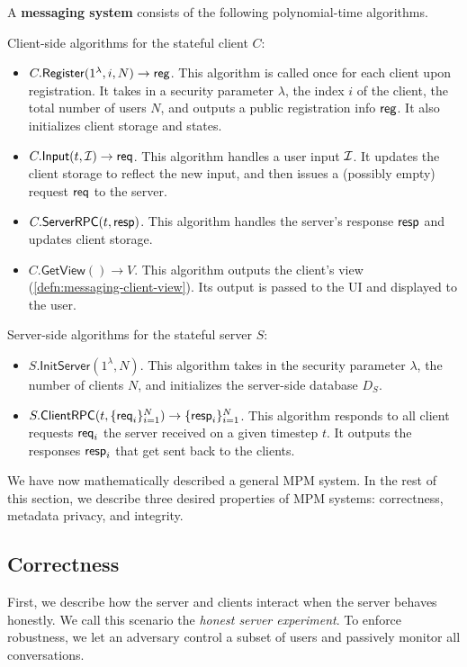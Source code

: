\begin{definition}
\label{defn:messaging-scheme}
A \textbf{messaging system} consists of the following polynomial-time algorithms.

Client-side algorithms for the stateful client $C$:
\begin{itemize}
    \item $C.\mathsf{Register}(1^{\lambda}, i, N) \to \mathsf{reg}$. This algorithm is called once for each client upon registration. It takes in a security parameter $\lambda$, the index $i$ of the client, the total number of users $N$, and outputs a public registration info $\mathsf{reg}$. It also initializes client storage and states.
    
    \item $C.\mathsf{Input}(t, \mathcal{I}) \to \mathsf{req}$. This algorithm handles a user input $\mathcal{I}$. It updates the client storage to reflect the new input, and then issues a (possibly empty) request $\mathsf{req}$ to the server.
    
    \item $C.\mathsf{ServerRPC}(t, \mathsf{resp})$. This algorithm handles the server's response $\mathsf{resp}$ and updates client storage.
    
    \item $C.\mathsf{GetView}() \to V$. This algorithm outputs the client's view (\cref{defn:messaging-client-view}). Its output is passed to the UI and displayed to the user.
\end{itemize}

Server-side algorithms for the stateful server $S$:

\begin{itemize}
    \item $S.\mathsf{InitServer}(1^{\lambda}, N)$. This algorithm takes in the security parameter $\lambda$, the number of clients $N$, and initializes the server-side database $D_S$.
    \item $S.\mathsf{ClientRPC}(t, \{\mathsf{req}_i\}_{i = 1}^N) \to \{\mathsf{resp}_i\}_{i = 1}^N$. This algorithm responds to all client requests $\mathsf{req}_i$ the server received on a given timestep $t$. It outputs the responses $\mathsf{resp}_i$ that get sent back to the clients.
\end{itemize}
\end{definition}

We have now mathematically described a general MPM system. In the rest of this section, we describe three desired properties of MPM systems: correctness, metadata privacy, and integrity.

\subsection{Correctness}
\label{subsec:messaging-correctness}
First, we describe how the server and clients interact when the server behaves honestly. We call this scenario the \textit{honest server experiment}. To enforce robustness, we let an adversary control a subset of users and passively monitor all conversations.

